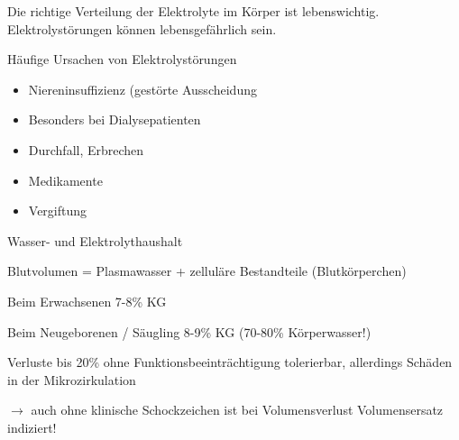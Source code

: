 \documentclass{article}
\begin{document}
{\mdseries
Die richtige Verteilung der Elektrolyte im K\"orper ist lebenswichtig.
Elektrolyst\"orungen k\"onnen lebensgef\"ahrlich sein. }

{\mdseries\color{black}
H\"aufige Ursachen von Elektrolyst\"orungen}

\begin{itemize}
\item {\mdseries
Niereninsuffizienz (gest\"orte Ausscheidung}

\end{itemize}
\begin{itemize}
\item {\mdseries
Besonders bei Dialysepatienten}

\end{itemize}
\begin{itemize}
\item {\mdseries
Durchfall, Erbrechen }

\item {\mdseries
Medikamente}

\item {\mdseries
Vergiftung}

\end{itemize}
{\mdseries\color{black}
Wasser- und Elektrolythaushalt}

{\mdseries
Blutvolumen = Plasmawasser + zellul\"are Bestandteile
(Blutk\"orperchen)}

Beim Erwachsenen 7-8\% KG

Beim Neugeborenen / S\"augling 8-9\% KG  (70-80\%  K\"orperwasser!)

{\mdseries
Verluste bis 20\% ohne Funktionsbeeintr\"achtigung tolerierbar,
allerdings Sch\"aden in der  Mikrozirkulation}

{\mdseries
${\rightarrow}$ auch ohne klinische Schockzeichen  ist bei
Volumensverlust Volumensersatz  indiziert!}
\end{document}
